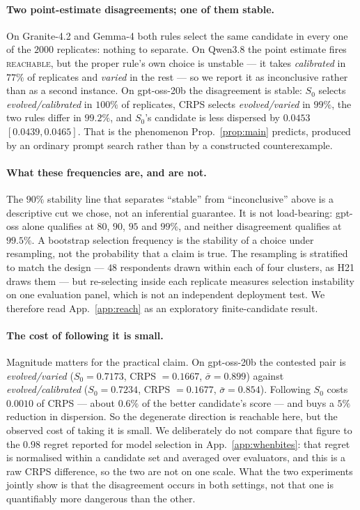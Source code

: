 \documentclass[11pt]{article}
\begin{document}
\paragraph{Two point-estimate disagreements; one of them stable.} On Granite-4.2
and Gemma-4 both rules select the same candidate in every one of the $2000$
replicates: nothing to separate. On Qwen3.8 the point estimate fires
\textsc{reachable}, but the proper rule's own choice is unstable --- it takes
\textit{calibrated} in $77\%$ of replicates and \textit{varied} in the rest ---
so we report it as inconclusive rather than as a second instance. On
gpt-oss-20b the disagreement is stable: $S_0$ selects \textit{evolved/calibrated}
in $100\%$ of replicates, CRPS selects \textit{evolved/varied} in $99\%$, the two
rules differ in $99.2\%$, and $S_0$'s candidate is less dispersed by $0.0453$
$[0.0439,0.0465]$. That is the phenomenon Prop.~\ref{prop:main} predicts, produced
by an ordinary prompt search rather than by a constructed counterexample.

\paragraph{What these frequencies are, and are not.} The $90\%$ stability line
that separates ``stable'' from ``inconclusive'' above is a descriptive cut we
chose, not an inferential guarantee. It is not load-bearing: gpt-oss alone
qualifies at $80$, $90$, $95$ and $99\%$, and neither disagreement qualifies at
$99.5\%$. A bootstrap selection frequency is the stability
of a choice under resampling, not the probability that a claim is true. The
resampling is stratified to match the design --- $48$ respondents drawn within
each of four clusters, as H21 draws them --- but re-selecting inside each
replicate measures selection instability on one evaluation panel, which is not
an independent deployment test. We therefore read App.~\ref{app:reach} as an
exploratory finite-candidate result.

\paragraph{The cost of following it is small.} Magnitude matters for the
practical claim. On gpt-oss-20b the contested pair is
\textit{evolved/varied} ($S_0=0.7173$, CRPS $=0.1667$, $\bar\sigma=0.899$)
against \textit{evolved/calibrated} ($S_0=0.7234$, CRPS $=0.1677$,
$\bar\sigma=0.854$). Following $S_0$ costs $0.0010$ of CRPS --- about $0.6\%$ of
the better candidate's score --- and buys a $5\%$ reduction in dispersion. So the
degenerate direction is reachable here, but the observed cost of taking it is
small. We deliberately do not compare that figure to the $0.98$ regret reported
for model selection in App.~\ref{app:whenbites}: that regret is normalised
within a candidate set and averaged over evaluators, and this is a raw CRPS
difference, so the two are not on one scale. What the two experiments jointly
show is that the disagreement occurs in both settings, not that one is
quantifiably more dangerous than the other.
\end{document}
